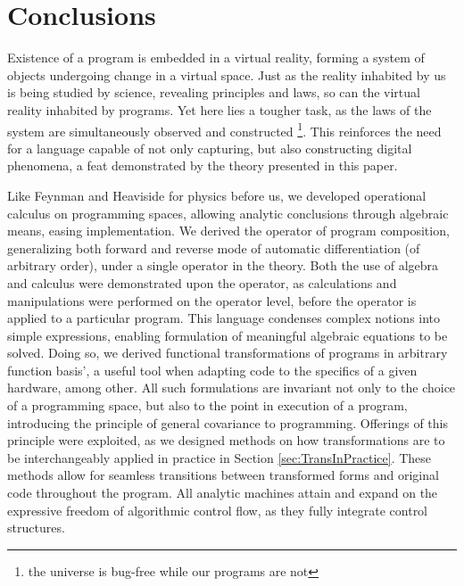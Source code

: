 \documentclass{article}
\begin{document}
\section{Conclusions}

Existence of a program is embedded in a virtual reality, forming a system of objects undergoing change in a virtual space. Just as the reality inhabited by us is being studied by science, revealing principles and laws, so can the virtual reality inhabited by programs. Yet here lies a tougher task, as the laws of the system are simultaneously observed and constructed \footnote{the universe is bug-free while our programs are not}. This reinforces the need for a language capable of not only capturing, but also constructing digital phenomena, a feat demonstrated by the theory presented in this paper. 

Like Feynman \cite{Feynman} and Heaviside \cite{HeavisideOperational} for physics before us, we developed operational calculus on programming spaces, allowing analytic conclusions through algebraic means, easing implementation. We derived the operator of program composition, generalizing both forward and reverse mode of automatic differentiation (of arbitrary order), under a single operator in the theory. Both the use of algebra and calculus were demonstrated upon the operator, as calculations and manipulations were performed on the operator level, before the operator is applied to a particular program.
This language condenses complex notions into simple expressions, enabling formulation of meaningful algebraic equations to be solved. Doing so, we derived functional transformations of programs in arbitrary function basis', a useful tool when adapting code to the specifics of a given hardware, among other.
All such formulations are invariant not only to the choice of a programming space, but also to the point in execution of a program, introducing the principle of general covariance \cite{GeneralCovariance} to programming. Offerings of this principle were exploited, as we designed methods on how transformations are to be interchangeably applied in practice in Section \ref{sec:TransInPractice}. These methods allow for seamless transitions between transformed forms and original code throughout the program. All analytic machines attain and expand on the expressive freedom of algorithmic control flow, as they fully integrate control structures.
\end{document}
